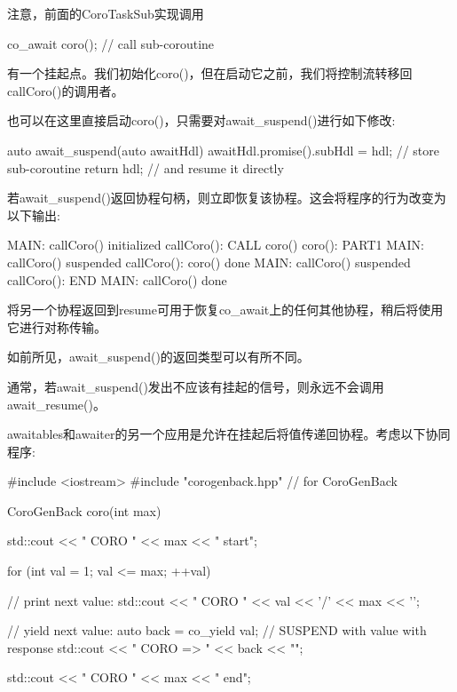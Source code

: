 
注意，前面的CoroTaskSub实现调用

\begin{cpp}
co_await coro(); // call sub-coroutine
\end{cpp}

有一个挂起点。我们初始化coro()，但在启动它之前，我们将控制流转移回callCoro()的调用者。

也可以在这里直接启动coro()，只需要对await\_suspend()进行如下修改:

\begin{cpp}
auto await_suspend(auto awaitHdl) {
	awaitHdl.promise().subHdl = hdl; // store sub-coroutine
	return hdl; // and resume it directly
}
\end{cpp}

若await\_suspend()返回协程句柄，则立即恢复该协程。这会将程序的行为改变为以下输出:

\begin{shell}
MAIN: callCoro() initialized
  callCoro(): CALL coro()
    coro(): PART1
MAIN: callCoro() suspended
  callCoro(): coro() done
MAIN: callCoro() suspended
  callCoro(): END
MAIN: callCoro() done
\end{shell}

将另一个协程返回到resume可用于恢复co\_await上的任何其他协程，稍后将使用它进行对称传输。

如前所见，await\_suspend()的返回类型可以有所不同。

通常，若await\_suspend()发出不应该有挂起的信号，则永远不会调用await\_resume()。


awaitables和awaiter的另一个应用是允许在挂起后将值传递回协程。考虑以下协同程序:


\begin{cpp}
#include <iostream>
#include "corogenback.hpp" // for CoroGenBack

CoroGenBack coro(int max)
{
	std::cout << "              CORO " << max << " start\n";
	
	for (int val = 1; val <= max; ++val) {
		// print next value:
		std::cout << " CORO " << val << '/' << max << '\n';
		
		// yield next value:
		auto back = co_yield val; // SUSPEND with value with response
		std::cout << "           CORO => " << back << "\n";
	}
	
	std::cout << "             CORO " << max << " end\n";
}
\end{cpp}

